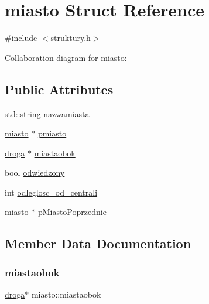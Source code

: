 \hypertarget{structmiasto}{}\section{miasto Struct Reference}
\label{structmiasto}


{\ttfamily \#include $<$struktury.\+h$>$}



Collaboration diagram for miasto\+:
\subsection*{Public Attributes}
\begin{DoxyCompactItemize}
\item 
std\+::string \mbox{\hyperlink{structmiasto_a75a023beb08b889860c2068ffd47318e}{nazwamiasta}}
\item 
\mbox{\hyperlink{structmiasto}{miasto}} $\ast$ \mbox{\hyperlink{structmiasto_a9cd7b8d4e3e00ba833d3149b76a918f9}{pmiasto}}
\item 
\mbox{\hyperlink{structdroga}{droga}} $\ast$ \mbox{\hyperlink{structmiasto_af69437beea5c134e233947df273a48a4}{miastaobok}}
\item 
bool \mbox{\hyperlink{structmiasto_a7a2028174edb36e184c06d084d02ef27}{odwiedzony}}
\item 
int \mbox{\hyperlink{structmiasto_a0c3b5abe9b7ab0df2ceb80f9bd3faec3}{odleglosc\+\_\+od\+\_\+centrali}}
\item 
\mbox{\hyperlink{structmiasto}{miasto}} $\ast$ \mbox{\hyperlink{structmiasto_a8238eaa6785b35e180170ae00996e515}{p\+Miasto\+Poprzednie}}
\end{DoxyCompactItemize}


\subsection{Member Data Documentation}
\mbox{\label{structmiasto_af69437beea5c134e233947df273a48a4}} 
\subsubsection{\texorpdfstring{miastaobok}{miastaobok}}
{\footnotesize\ttfamily \mbox{\hyperlink{structdroga}{droga}}$\ast$ miasto\+::miastaobok}

\mbox{\label{structmiasto_a75a023beb08b889860c2068ffd47318e}} 

